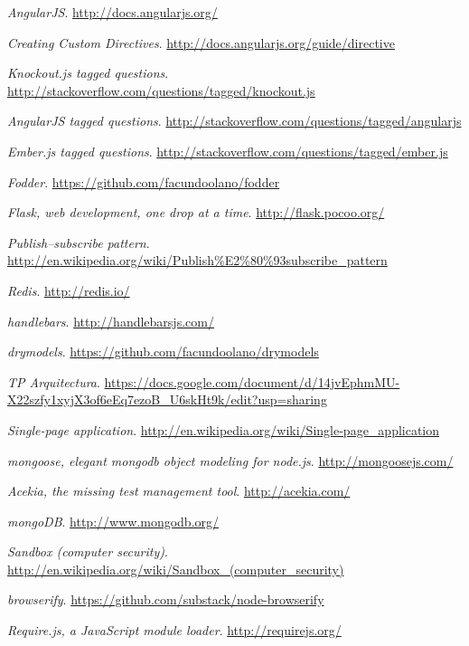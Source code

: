 \documentclass[doc,helv,longtable]{article}
\begin{document}
\begin{thebibliography}{150}
  \emph{AngularJS}.
  \url{http://docs.angularjs.org/}

  \emph{Creating Custom Directives}.
  \url{http://docs.angularjs.org/guide/directive}

  \emph{Knockout.js tagged questions}.
  \url{http://stackoverflow.com/questions/tagged/knockout.js}

  \emph{AngularJS tagged questions}.
  \url{http://stackoverflow.com/questions/tagged/angularjs}

  \emph{Ember.js tagged questions}.
  \url{http://stackoverflow.com/questions/tagged/ember.js}

  \emph{Fodder}.
  \url{https://github.com/facundoolano/fodder}

  \emph{Flask, web development, one drop at a time}.
  \url{http://flask.pocoo.org/}

  \emph{Publish–subscribe pattern}.
  \url{http://en.wikipedia.org/wiki/Publish%E2%80%93subscribe_pattern}

  \emph{Redis}.
  \url{http://redis.io/}

  \emph{handlebars}.
  \url{http://handlebarsjs.com/}

  \emph{drymodels}.
  \url{https://github.com/facundoolano/drymodels}

  \emph{TP Arquitectura}.
  \url{https://docs.google.com/document/d/14jvEphmMU-X22szfy1xyjX3of6eEq7ezoB_U6skHt9k/edit?usp=sharing}

  \emph{Single-page application}.
  \url{http://en.wikipedia.org/wiki/Single-page_application}

  \emph{mongoose, elegant mongodb object modeling for node.js}.
  \url{http://mongoosejs.com/}

  \emph{Acekia, the missing test management tool}.
  \url{http://acekia.com/}

  \emph{mongoDB}.
  \url{http://www.mongodb.org/}

  \emph{Sandbox (computer security)}.
  \url{http://en.wikipedia.org/wiki/Sandbox_(computer_security)}

  \emph{browserify}.
  \url{https://github.com/substack/node-browserify}

  \emph{Require.js, a JavaScript module loader}.
  \url{http://requirejs.org/}


\end{thebibliography}
\end{document}
